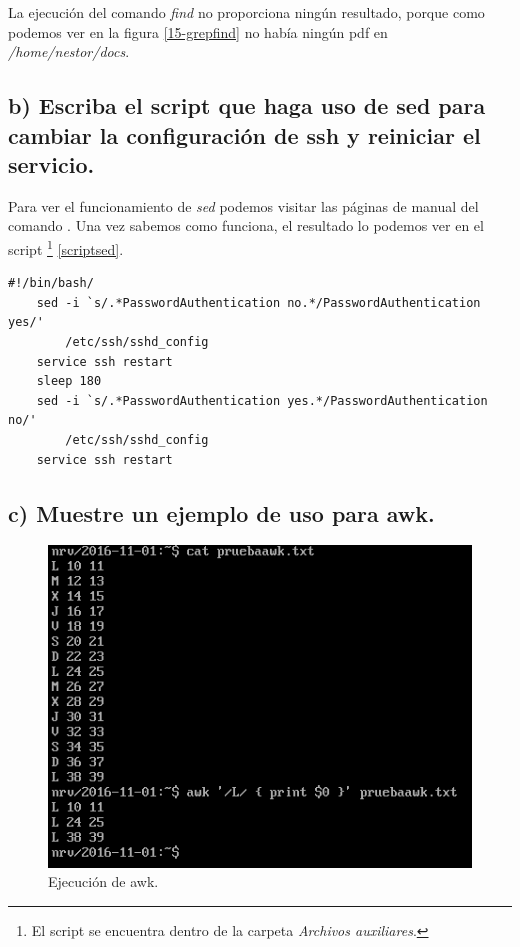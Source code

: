 \documentclass[a4paper,titlepage,12pt]{scrartcl}	%
\numberwithin{figure}{section} %
\numberwithin{table}{section} %
\begin{document}
	La ejecución del comando \textit{find} no proporciona ningún resultado, porque como podemos ver en la figura \ref{15-grepfind} no había ningún pdf en \textit{/home/nestor/docs}.
	
	\subsection[b) Escriba el script que haga uso de sed para cambiar la configuración de ssh y reiniciar el servicio.]{b) Escriba el script que haga uso de sed para cambiar la configuración de ssh y reiniciar el servicio.}
	
	Para ver el funcionamiento de \textit{sed} podemos visitar las páginas de manual del comando \cite{mansed}. Una vez sabemos como funciona, el resultado lo podemos ver en el script \footnote{El script se encuentra dentro de la carpeta \textit{Archivos auxiliares}.} \ref{scriptsed}. \\
	
	\lstset{language=bash, xleftmargin=-1cm, basicstyle=\footnotesize}	
	\begin{lstlisting}[label={scriptsed}]
	#!/bin/bash/
	sed -i `s/.*PasswordAuthentication no.*/PasswordAuthentication yes/'
	    /etc/ssh/sshd_config
	service ssh restart
	sleep 180
	sed -i `s/.*PasswordAuthentication yes.*/PasswordAuthentication no/'
	    /etc/ssh/sshd_config
	service ssh restart
	\end{lstlisting}
	
	\subsection[c) Muestre un ejemplo de uso para awk.]{c) Muestre un ejemplo de uso para awk.}
	
	\begin{figure}[H]
		\includegraphics[width=\linewidth]{./Imagenes/15-awk.png}
		\vspace{-0.5cm}
		\caption[Ejecución de awk.]{Ejecución de awk.}
		\label{15-awk}
	\end{figure}
	
\end{document}
